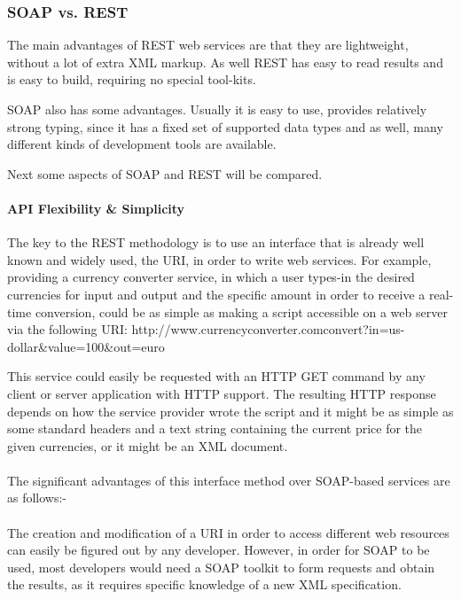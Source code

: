 \subsubsection{SOAP vs. REST\label{sec:back_soap_vs_rest}}

The main advantages of \ac{REST} web services are that they are lightweight, without a lot of extra \ac{XML} markup. As well \ac{REST} has easy to read results and is easy to build, requiring no special tool-kits.

\ac{SOAP} also has some advantages. Usually it is easy to use, provides relatively strong typing, since it has a fixed set of supported data types and as well, many different kinds of development tools are available.

Next some aspects of \ac{SOAP} and \ac{REST} will be compared.

\paragraph{API Flexibility \& Simplicity}

The key to the \ac{REST} methodology is to use an interface that is already well known and widely used, the \ac{URI}, in order to write web services. For example, providing a currency converter service, in which a user types-in the desired currencies for input and output and the specific amount in order to receive a real-time conversion, could be as simple as making a script accessible on a web server via the following \ac{URI}: http://www.currencyconverter.com\/convert?in=us-dollar\&value=100\&out=euro

This service could easily be requested with an \ac{HTTP} GET command by any client or server application with \ac{HTTP} support. The resulting \ac{HTTP} response depends on how the service provider wrote the script and it might be as simple as some standard headers and a text string containing the current price for the given currencies, or it might be an \ac{XML} document.
\\
\\
The significant advantages of this interface method over \ac{SOAP}-based services are as follows:-
\\
\\
The creation and modification of a \ac{URI} in order to access different web resources can easily be figured out by any developer. However, in order for \ac{SOAP} to be used, most developers would need a \ac{SOAP} toolkit to form requests and obtain the results, as it requires specific knowledge of a new \ac{XML} specification.
\\
\\
